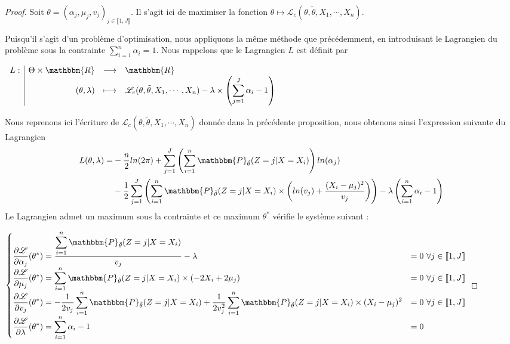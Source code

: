 \documentclass[frenchb]{report}
\newcommand{\R}{\mathbbm{R}}
\newcommand{\1}{\mathbbm{1}}
\newcommand{\prob}{\mathbbm{P}}
\newcommand{\lv}{\mathcal{L}}
\newcommand{\thetat}{\tilde{\theta}}
\theoremstyle{definition}\newtheorem{defn}{Définition}
\theoremstyle{definition}\newtheorem{exm}{Exemple}
\theoremstyle{definition}\newtheorem{nota}{Notation}
\theoremstyle{definition}\newtheorem{rem}{Remarque}
\begin{document}
\begin{proof}
Soit $\theta = (\alpha_j, \mu_j, v_j)_{j\in\llbracket1,J\rrbracket}$. Il s'agit ici de maximiser la fonction $\theta \mapsto \lv_{c}(\theta,\thetat, X_1, \cdots, X_n)$.

Puisqu'il s'agit d'un problème d'optimisation, nous appliquons la même méthode que précédemment, en introduisant le Lagrangien du problème sous la contrainte $\displaystyle\sum_{i=1}^n\alpha_i = 1$.
Nous rappelons que le Lagrangien $L$ est définit par

\begin{center}
$
\begin{array}{l|rcl}
L : & \Theta\times\R & \longrightarrow & \R \\
    & (\theta, \lambda) & \longmapsto & \mathcal{L}_c(\theta, \thetat, X_1, \cdots, X_n) - \lambda\times\left(\displaystyle\sum_{j=1}^J\alpha_i - 1\right)
\end{array}
$
\end{center}

Nous reprenons ici l'écriture de $\lv_c(\theta,\thetat,X_1, \cdots, X_n)$ donnée dans la précédente proposition, nous obtenons ainsi l'expression suivante du Lagrangien
\begin{align*}
L(\theta,\lambda) = &-\frac{n}{2}ln(2\pi)+\sum_{j=1}^J \left(\sum_{i = 1}^n  \prob_{\thetat}(Z=j|X=X_i)\right) ln(\alpha_j)\\
&-\frac{1}{2}\sum_{j=1}^J\left(\sum_{i=1}^n \prob_{\thetat}(Z=j|X=X_i)\times\left(ln(v_j)+\frac{(X_i-\mu_j)^2}{v_j}\right)\right) - \lambda\left(\sum_{i=1}^n\alpha_i-1\right)
\end{align*}
Le Lagrangien admet un maximum sous la contrainte et ce maximum $\theta^*$ vérifie le système suivant :

$
\begin{cases}
\displaystyle\frac{\partial \lv}{\partial \alpha_j} (\theta^*) = \frac{\displaystyle\sum_{i=1}^n \prob_{\thetat}(Z=j|X=X_i)}{v_j} - \lambda &=0 \text{ } \forall j \in \llbracket 1,J \rrbracket \\
\displaystyle\frac{\partial \lv}{\partial \mu_j} (\theta^*) = \displaystyle\sum_{i=1}^n \prob_{\thetat}(Z=j|X=X_i)\times(-2X_i+2\mu_j) &=0 \text{ } \forall j \in \llbracket 1,J \rrbracket \\
\displaystyle\frac{\partial \lv}{\partial v_j} (\theta^*) = -\displaystyle\frac{1}{2v_j}\sum_{i=1}^n \prob_{\thetat}(Z=j|X=X_i) + \frac{1}{2v_j^2}\sum_{i=1}^n \prob_{\thetat}(Z=j|X=X_i)\times(X_i-\mu_j)^2 &=0 \text{ } \forall j \in \llbracket 1,J \rrbracket \\
\displaystyle\frac{\partial \lv}{\partial \lambda} (\theta^*) = \sum_{i=1}^n\alpha_i-1 &=0 
\end{cases}
$


\end{proof}
\end{document}

